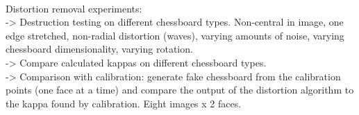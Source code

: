  \\
Distortion removal experiments:\\
-> Destruction testing on different chessboard types. Non-central in image, one edge stretched, non-radial distortion (waves), varying amounts of noise, varying chessboard dimensionality, varying rotation.\\
-> Compare calculated kappas on different chessboard types.\\
-> Comparison with calibration: generate fake chessboard from the calibration points (one face at a time) and compare the output of the distortion algorithm to the kappa found by calibration. Eight images x 2 faces.\\

